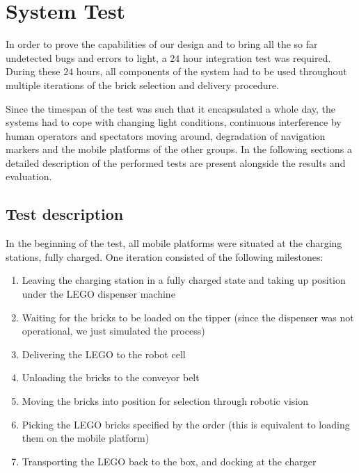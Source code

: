 \chapter{System Test}\label{chap:system_test_chapter}


In order to prove the capabilities of our design and to bring all the so far undetected bugs and errors to light, a $24$ hour integration test was required. During these $24$ hours, all components of the system had to be used throughout multiple iterations of the brick selection and delivery procedure. 

Since the timespan of the test was such that it encapsulated a whole day, the systems had to cope with changing light conditions, continuous interference by human operators and spectators moving around, degradation of navigation markers and the mobile platforms of the other groups. In the following sections a detailed description of the performed tests are present alongside the results and evaluation.

\section{Test description}
In the beginning of the test, all mobile platforms were situated at the charging stations, fully charged. One iteration consisted of the following milestones:

\begin{enumerate}
	\item Leaving the charging station in a fully charged state and taking up position under the LEGO dispenser machine
	\item Waiting for the bricks to be loaded on the tipper (since the dispenser was not operational, we just simulated the process)
	\item Delivering the LEGO to the robot cell
	\item Unloading the bricks to the conveyor belt
	\item Moving the bricks into position for selection through robotic vision
	\item Picking the LEGO bricks specified by the order (this is equivalent to loading them on the mobile platform)
	\item Transporting the LEGO back to the box, and docking at the charger
\end{enumerate}

